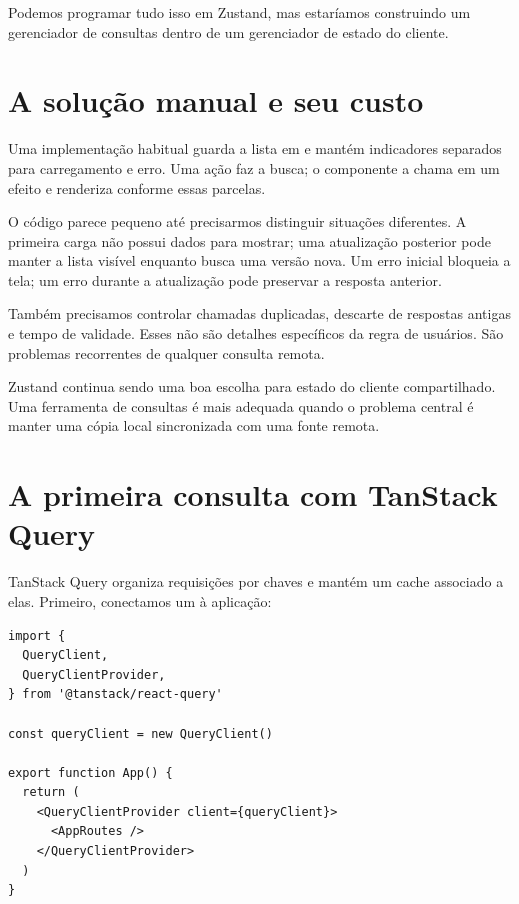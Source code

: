 Podemos programar tudo isso em Zustand, mas estaríamos construindo um gerenciador
de consultas dentro de um gerenciador de estado do cliente.

\section{A solução manual e seu custo}

Uma implementação habitual guarda a lista em  e mantém indicadores
separados para carregamento e erro. Uma ação  faz a busca; o
componente a chama em um efeito e renderiza conforme essas parcelas.

O código parece pequeno até precisarmos distinguir situações diferentes. A
primeira carga não possui dados para mostrar; uma atualização posterior pode
manter a lista visível enquanto busca uma versão nova. Um erro inicial bloqueia
a tela; um erro durante a atualização pode preservar a resposta anterior.

Também precisamos controlar chamadas duplicadas, descarte de respostas antigas
e tempo de validade. Esses não são detalhes específicos da regra de usuários.
São problemas recorrentes de qualquer consulta remota.

\begin{decisao}
Zustand continua sendo uma boa escolha para estado do cliente compartilhado. Uma
ferramenta de consultas é mais adequada quando o problema central é manter uma
cópia local sincronizada com uma fonte remota.
\end{decisao}

\section{A primeira consulta com TanStack Query}

TanStack Query organiza requisições por chaves e mantém um cache associado a
elas. Primeiro, conectamos um  à aplicação:

\begin{lstlisting}[caption={Cliente de consultas na raiz da aplicação.}]
import {
  QueryClient,
  QueryClientProvider,
} from '@tanstack/react-query'

const queryClient = new QueryClient()

export function App() {
  return (
    <QueryClientProvider client={queryClient}>
      <AppRoutes />
    </QueryClientProvider>
  )
}
\end{lstlisting}

